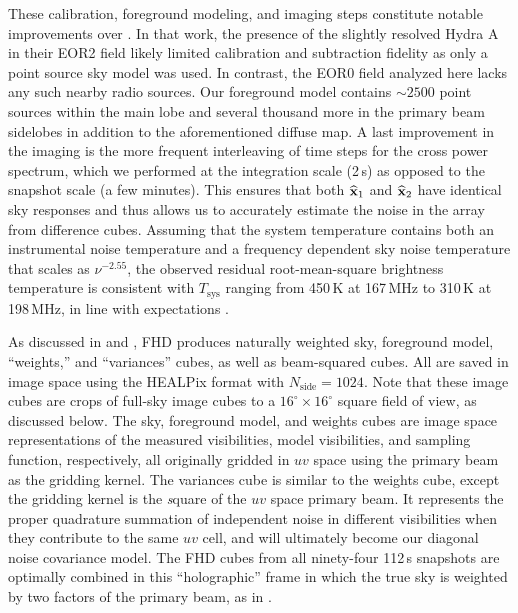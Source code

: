 These calibration, foreground modeling, and imaging steps constitute notable improvements over \citet{X13}. In that work, the presence of the slightly resolved Hydra A in their EOR2 field likely limited calibration and subtraction fidelity as only a point source sky model was used. In contrast, the EOR0 field analyzed here lacks any such nearby radio sources. Our foreground model contains $\sim 2500$ point sources within the main lobe and several thousand more in the primary beam sidelobes in addition to the aforementioned diffuse map. A last improvement in the imaging is the more frequent interleaving of time steps for the cross power spectrum, which we performed at the integration scale (2\,s) as opposed to the snapshot scale (a few minutes). This ensures that both $\widehat{\mathbf{x}}_1$ and $\widehat{\mathbf{x}}_2$ have identical sky responses and thus allows us to accurately estimate the noise in the array from difference cubes. Assuming that the system temperature contains both an instrumental noise temperature and a frequency dependent sky noise temperature that scales as $\nu^{-2.55}$, the observed residual root-mean-square brightness temperature is consistent with $T_\text{sys}$ ranging from 450\,K at 167\,MHz to 310\,K at 198\,MHz, in line with expectations \citep{beardsley13}.

As discussed in \citet{JacobsPipelines} and \citet{HazeltonEppsilon}, FHD produces naturally weighted sky, foreground model, ``weights,'' and ``variances'' cubes, as well as beam-squared cubes. All are saved in image space using the HEALPix format \citep{healpix} with $N_\text{side}=1024$. Note that these image cubes are crops of full-sky image cubes to a $16^\circ\times16^\circ$ square field of view, as discussed below. The sky, foreground model, and weights cubes are image space representations of the measured visibilities, model visibilities, and sampling function, respectively, all originally gridded in $uv$ space using the primary beam as the gridding kernel. The variances cube is similar to the weights cube, except the gridding kernel is the {\textit square} of the $uv$ space primary beam. It represents the proper quadrature summation of independent noise in different visibilities when they contribute to the same $uv$ cell, and will ultimately become our diagonal noise covariance model. The FHD cubes from all ninety-four 112\,s snapshots are optimally combined in this ``holographic'' frame in which the true sky is weighted by two factors of the primary beam, as in \citet{X13}.

